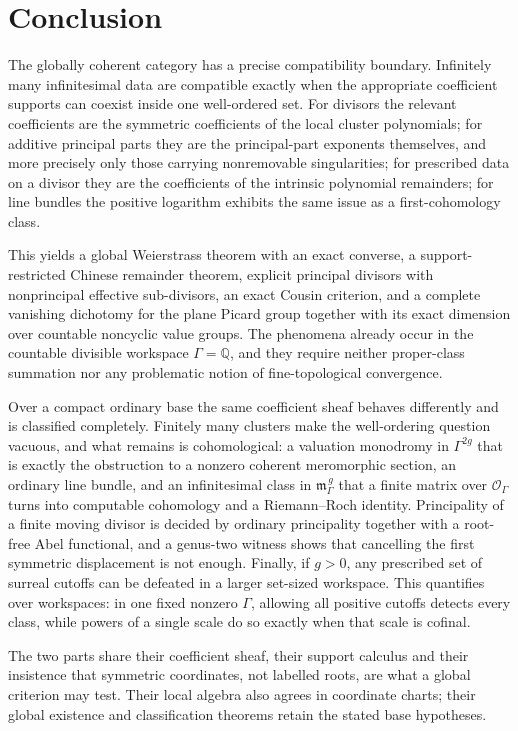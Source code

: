 \documentclass[11pt,letterpaper]{article}
\theoremstyle{definition}
\theoremstyle{remark}
\newcommand{\Q}{\mathbb Q}
\newcommand{\OO}{\mathcal O}
\newcommand{\mK}{\mathfrak m_\Gamma}
\numberwithin{equation}{section}
\begin{document}
\section{Conclusion}

The globally coherent category has a precise compatibility boundary. Infinitely many infinitesimal data are compatible exactly when the appropriate coefficient supports can coexist inside one well-ordered set. For divisors the relevant coefficients are the symmetric coefficients of the local cluster polynomials; for additive principal parts they are the principal-part exponents themselves, and more precisely only those carrying nonremovable singularities; for prescribed data on a divisor they are the coefficients of the intrinsic polynomial remainders; for line bundles the positive logarithm exhibits the same issue as a first-cohomology class.

This yields a global Weierstrass theorem with an exact converse, a support-restricted Chinese remainder theorem, explicit principal divisors with nonprincipal effective sub-divisors, an exact Cousin criterion, and a complete vanishing dichotomy for the plane Picard group together with its exact dimension over countable noncyclic value groups. The phenomena already occur in the countable divisible workspace $\Gamma=\Q$, and they require neither proper-class summation nor any problematic notion of fine-topological convergence.

Over a compact ordinary base the same coefficient sheaf behaves differently and is classified completely. Finitely many clusters make the well-ordering question vacuous, and what remains is cohomological: a valuation monodromy in $\Gamma^{2g}$ that is exactly the obstruction to a nonzero coherent meromorphic section, an ordinary line bundle, and an infinitesimal class in $\mK^{\,g}$ that a finite matrix over $\OO_\Gamma$ turns into computable cohomology and a Riemann--Roch identity. Principality of a finite moving divisor is decided by ordinary principality together with a root-free Abel functional, and a genus-two witness shows that cancelling the first symmetric displacement is not enough. Finally, if $g>0$, any prescribed set of surreal cutoffs can be defeated in a larger set-sized workspace. This quantifies over workspaces: in one fixed nonzero $\Gamma$, allowing all positive cutoffs detects every class, while powers of a single scale do so exactly when that scale is cofinal.

The two parts share their coefficient sheaf, their support calculus and their insistence that symmetric coordinates, not labelled roots, are what a global criterion may test. Their local algebra also agrees in coordinate charts; their global existence and classification theorems retain the stated base hypotheses.
\end{document}
